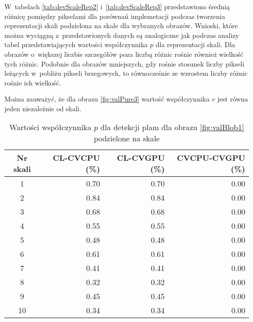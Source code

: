W~tabelach \ref{tab:devScaleRep2} i~\ref{tab:devScaleRep3} przedstawiono średnią różnicę pomiędzy pikselami dla porównań implemetacji podczas tworzenia reprezentacji skali podzielona na skale dla wybranych obrazów. Wnioski, które można wyciągną z~przedstawionych danych są analogiczne jak podczas analizy tabel przedstawiających wartości współczynnika $ p $ dla reprezentacji skali. Dla obrazów o~większej liczbie szczegółów poza liczbą różnic rośnie również wielkość tych różnic. Podobnie dla obrazów mniejszych, gdy rośnie stosunek liczby pikseli leżących w~pobliżu pikseli brzegowych, to równocześnie ze wzrostem liczby różnic rośnie ich wielkość.

Można zauważyć, że dla obrazu \ref{fig:valPure3} wartość współczynnika $ v $ jest równa jeden niezależnie od skali.


\begin{center}
\begin{table}
\centering
\caption{Wartości współczynnika $ p $ dla detekcji plam dla obrazu \ref{fig:valBlob1} podzielone na skale}
\label{tab:imageScaleBlob1}
\begin{tabular}{|c|r|r|r|}
 \hline
Nr skali & CL-CVCPU (\%) & CL-CVGPU (\%) & CVCPU-CVGPU (\%) \\ \hline
1        & 0.70     & 0.70     & 0.00        \\ \hline
2        & 0.84     & 0.84     & 0.00       \\ \hline
3        & 0.68     & 0.68     & 0.00       \\ \hline
4        & 0.55     & 0.55     & 0.00        \\ \hline
5        & 0.48     & 0.48     & 0.00        \\ \hline
6        & 0.61     & 0.61     & 0.00        \\ \hline
7        & 0.41     & 0.41     & 0.00        \\ \hline
8        & 0.32     & 0.32     & 0.00        \\ \hline
9        & 0.45     & 0.45     & 0.00        \\ \hline
10       & 0.34     & 0.34     & 0.00        \\ \hline
\end{tabular}
\end{table}
\end{center}

